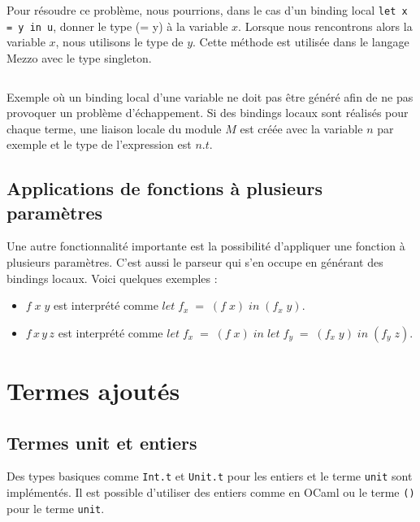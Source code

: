 Pour résoudre ce problème, nous pourrions, dans le cas d'un binding local
\verb|let x = y in u|, donner le type (= y) à la variable $x$. Lorsque nous
rencontrons alors la variable $x$, nous utilisons le type de $y$. Cette méthode
est utilisée dans le langage Mezzo\cite{mezzo} avec le type singleton.

\begin{listing}
  \inputminted{OCaml}{codes/terms_binding_variable.rml}
  \caption{Exemple où un binding local d'une variable ne doit pas être généré
    afin de ne pas provoquer un problème d'échappement. Si des bindings locaux
    sont réalisés pour chaque terme, une liaison locale du module $M$ est
    créée avec la variable $n$ par exemple et le type de l'expression est $n.t$.}
  \label{code:implementation-grammar-terms-examples}
\end{listing}

\subsection*{Applications de fonctions à plusieurs paramètres}

Une autre fonctionnalité importante est la possibilité d'appliquer une fonction
à plusieurs
paramètres. C'est aussi le parseur qui s'en occupe en générant
des bindings locaux. Voici quelques exemples :

\begin{itemize}
\item $f \; x \; y$ est interprété comme $let \; f_{x} \; = \; (f \; x) \; in \;
  (f_{x} \; y)$.
\item $f \,  x \, y \, z$ est interprété comme $let \; f_{x} \; = \; (f \; x) \;
  in \; let \; f_{y} \; = \; (f_{x} \; y) \; in \; (f_{y} \; z)$.
\end{itemize}

\section{Termes ajoutés}

\subsection*{Termes unit et entiers}

Des types basiques comme \verb|Int.t| et \verb|Unit.t| pour les entiers et le terme
\verb|unit| sont implémentés. Il est possible d'utiliser des entiers comme en
OCaml ou le terme \verb|()| pour le terme \verb|unit|.

